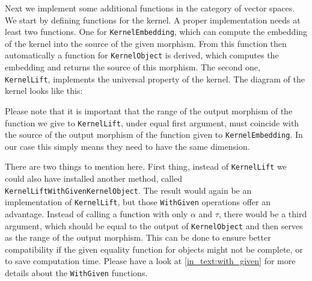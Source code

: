 Next we implement some additional functions in the category of vector spaces. We start by defining functions for the kernel.
A proper implementation needs at least two functions. One for \texttt{KernelEmbedding}, which can compute the embedding of the kernel
into the source of the given morphism. From this function then automatically a function for \texttt{KernelObject} is derived, which
computes the embedding and returns the source of this morphism. The second one, \texttt{KernelLift}, implements the universal property of the kernel.
The diagram of the kernel looks like this:
\begin{center}
\end{center}

Please note that it is important that the range of the output morphism of the function we give to \texttt{KernelLift},
under equal first argument, must coincide with the source of the output morphism of the function given to \texttt{KernelEmbedding}.
In our case this simply means they need to have the same dimension.



There are two things to mention here.
First thing, instead of \texttt{KernelLift} we could also have installed another method,
called \texttt{KernelLiftWithGivenKernelObject}. The result would again be an implementation of \texttt{KernelLift}, but those
\texttt{WithGiven} operations offer an advantage. Instead of calling a function with only $\alpha$ and $\tau$, there
would be a third argument, which should be equal to the output of \texttt{KernelObject} and then serves as the range of the output morphism.
This can be done to ensure better compatibility if the given equality function for objects might not be complete, or to save computation time.
Please have a look at \ref{in_text:with_given} for more details about the \texttt{WithGiven} functions.

